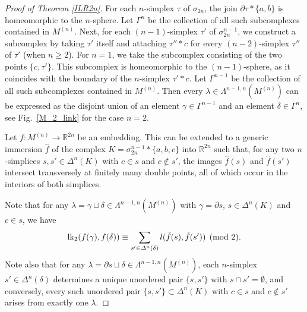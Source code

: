 \documentclass{amsart}
\theoremstyle{definition}
\theoremstyle{remark}
\numberwithin{equation}{section}
\begin{document}
\begin{proof}[Proof of Theorem \ref{ILR2n}]
For each $n$-simplex $\tau$ of $\sigma_{2n}$, the join $\partial\tau * \{a,b\}$ is homeomorphic to the $n$-sphere. Let $\Gamma^n$ be the collection of all such subcomplexes contained in $M^{(n)}$. Next, for each $(n-1)$-simplex $\tau'$ of $\sigma_{2n}^{n-1}$, we construct a subcomplex by taking $\tau'$ itself and attaching $\tau'' * c$ for every $(n-2)$-simplex $\tau''$ of $\tau'$ (when $n\ge 2$). For $n=1$, we take the subcomplex consisting of the two points $\{c, \tau'\}$. This subcomplex is homeomorphic to the $(n-1)$-sphere, as it coincides with the boundary of the $n$-simplex $\tau' * c$. Let $\Gamma^{n-1}$ be the collection of all such subcomplexes contained in $M^{(n)}$. Then every $\lambda \in \Lambda^{n-1,n}(M^{(n)})$ can be expressed as the disjoint union of an element $\gamma \in \Gamma^{n-1}$ and an element $\delta \in \Gamma^n$, see Fig.~\ref{M_2_link} for the case $n=2$.

Let $f \colon M^{(n)} \to \mathbb{R}^{2n}$ be an embedding. This can be extended to a generic immersion $\hat{f}$ of the complex $K = \sigma_{2n}^{n-1} * \{a,b,c\}$ into $\mathbb{R}^{2n}$ such that, for any two $n$-simplices $s,s' \in \varDelta^n(K)$ with $c \in s$ and $c \notin s'$, the images $\hat{f}(s)$ and $\hat{f}(s')$ intersect transversely at finitely many double points, all of which occur in the interiors of both simplices. 

Note that for any $\lambda = \gamma \sqcup \delta \in \Lambda^{n-1,n}(M^{(n)})$ with $\gamma = \partial s$, $s \in \varDelta^n(K)$ and $c \in s$, we have
\begin{eqnarray}\label{lkdef}
{\rm lk}_{2}(f(\gamma),f(\delta))
\equiv \sum_{s'\in \varDelta^{n}(\delta)} l(\hat{f}(s),\hat{f}(s')) \pmod{2}.
\end{eqnarray}
Note also that for any $\lambda = \partial s \sqcup \delta \in \Lambda^{n-1,n}(M^{(n)})$, each $n$-simplex $s' \in \varDelta^n(\delta)$ determines a unique unordered pair $\{s,s'\}$ with $s \cap s' = \emptyset$, and conversely, every such unordered pair $\{s,s'\} \subset \varDelta^n(K)$ with $c \in s$ and $c \notin s'$ arises from exactly one $\lambda$. 


\end{proof}
\end{document}
